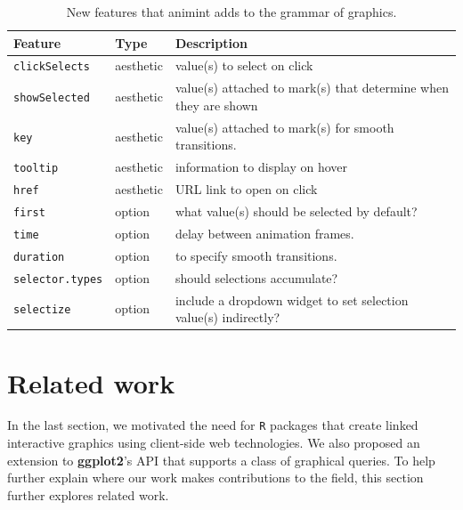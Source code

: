 \documentclass[12pt,]{article}
\theoremstyle{definition}
\theoremstyle{definition}
\theoremstyle{definition}
\theoremstyle{remark}
\begin{document}
\begin{table}

\caption{
New features that animint adds to the grammar of graphics.
}\label{tab:overview}
\small
\begin{tabularx}{\textwidth}{|l|l|l|}
\hline
Feature & Type & Description \\
\hline
\texttt{clickSelects} & aesthetic & value(s) to select on click \\
\texttt{showSelected} & aesthetic & value(s) attached to mark(s) that determine when they are shown  \\
\texttt{key} & aesthetic & value(s) attached to mark(s) for smooth transitions. \\
\texttt{tooltip} & aesthetic & information to display on hover \\
\texttt{href} & aesthetic & URL link to open on click \\
\texttt{first} & option & what value(s) should be selected by default?  \\
\texttt{time} & option & delay between animation frames.  \\
\texttt{duration} & option & to specify smooth transitions.  \\
\texttt{selector.types} & option & should selections accumulate?  \\
\texttt{selectize} & option & include a dropdown widget to set selection value(s) indirectly? \\
\hline
\end{tabularx}

\end{table}

\hypertarget{related-work}{%
\section{Related work}\label{related-work}}

In the last section, we motivated the need for \texttt{R} packages that
create linked interactive graphics using client-side web technologies.
We also proposed an extension to \textbf{ggplot2}'s API that supports a
class of graphical queries. To help further explain where our work makes
contributions to the field, this section further explores related work.
\end{document}
